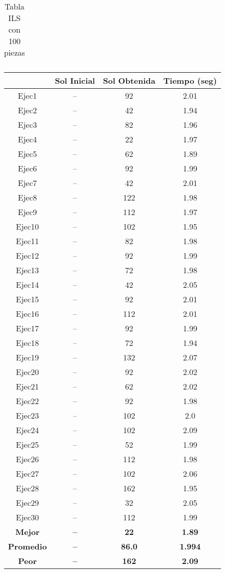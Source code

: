 \begin{center}
\begin{table}
\begin{tabular}{|c|c|c|c|}
\end{tabular}
\caption{Tabla ILS con 100 piezas}
\end{table}

\begin{table}

\begin{tabular}{|c|c|c|c|}


\hline
 & {\bf Sol Inicial} & {\bf Sol Obtenida} & {\bf Tiempo (seg)} \\
\hline
Ejec1 & -- & 92  & 2.01 \\
\hline
Ejec2 & -- & 42  & 1.94 \\
\hline
Ejec3 & -- & 82  & 1.96 \\
\hline
Ejec4 & -- & 22  & 1.97 \\
\hline
Ejec5 & -- & 62  & 1.89 \\
\hline
Ejec6 & -- & 92  & 1.99 \\
\hline
Ejec7 & -- & 42  & 2.01 \\
\hline
Ejec8 & -- & 122  & 1.98 \\
\hline
Ejec9 & -- & 112  & 1.97 \\
\hline
Ejec10 & -- & 102  & 1.95 \\
\hline
Ejec11 & -- & 82  & 1.98 \\
\hline
Ejec12 & -- & 92  & 1.99 \\
\hline
Ejec13 & -- & 72  & 1.98 \\
\hline
Ejec14 & -- & 42  & 2.05 \\
\hline
Ejec15 & -- & 92  & 2.01 \\
\hline
Ejec16 & -- & 112  & 2.01 \\
\hline
Ejec17 & -- & 92  & 1.99 \\
\hline
Ejec18 & -- & 72  & 1.94 \\
\hline
Ejec19 & -- & 132  & 2.07 \\
\hline
Ejec20 & -- & 92  & 2.02 \\
\hline
Ejec21 & -- & 62  & 2.02 \\
\hline
Ejec22 & -- & 92  & 1.98 \\
\hline
Ejec23 & -- & 102  & 2.0 \\
\hline
Ejec24 & -- & 102  & 2.09 \\
\hline
Ejec25 & -- & 52  & 1.99 \\
\hline
Ejec26 & -- & 112  & 1.98 \\
\hline
Ejec27 & -- & 102  & 2.06 \\
\hline
Ejec28 & -- & 162  & 1.95 \\
\hline
Ejec29 & -- & 32  & 2.05 \\
\hline
Ejec30 & -- & 112  & 1.99 \\
\hline
{\bf Mejor} & {\bf -- } & {\bf 22} & {\bf 1.89} \\
\hline
{\bf Promedio} & {\bf -- } & {\bf 86.0} & {\bf 1.994} \\
\hline
{\bf Peor} & {\bf -- } & {\bf 162} & {\bf 2.09} \\
\hline



\end{tabular}
\end{table}
\end{center}
